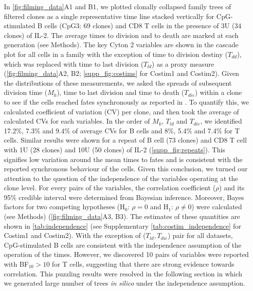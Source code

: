 \documentclass[11pt, a4paper]{article}
\begin{document}
In \cref{fig:filming_data}A1 and B1, we plotted clonally collapsed family trees of filtered clones as a single representative time line stacked vertically for CpG-stimulated B cells (CpG3: 69 clones) and CD8 T cells in the presence of  3U (34 clones) of IL-2. The average times to division and to death are marked at each generation (see Methods). The key Cyton 2 variables are shown in the cascade plot for all cells in a family with the exception of time to division destiny ($T_{dd}$), which was replaced with time to last division ($T_{ld}$) as a proxy measure (\cref{fig:filming_data}A2, B2; \cref{supp_fig:costims} for Costim1 and Costim2). Given the distributions of these measurements, we asked the spreads of subsequent division time ($M_k$), time to last division and time to death ($T_{die}$) within a clone to see if the cells reached fates synchronously as reported in \cite{Mitchell.2018, Marchingo.2016, Hawkins.2009}. To quantify this, we calculated coefficient of variation (CV) per clone, and then took the average of calculated CVs for each variables. In the order of $M_k$, $T_{ld}$ and $T_{die}$, we identified 17.2\%, 7.3\% and 9.4\% of average CVs for B cells and 8\%, 5.4\% and 7.4\% for T cells. Similar results were shown for a repeat of B cell (73 clones) and CD8 T cell with 1U (28 clones) and 10U (50 clones) of IL-2 (\cref{supp_fig:repeats}). This signifies low variation around the mean times to fates and is consistent with the reported synchronous behaviour of the cells. Given this conclusion, we turned our attention to the question of the independence of the variables operating at the clone level. For every pairs of the variables, the correlation coefficient ($\rho$) and its 95\% credible interval were determined from Bayesian inference. Moreover, Bayes factors for two competing hypotheses (H$_0$: $\rho=0$ and H$_1$: $\rho \neq 0$) were calculated (see Methods) (\cref{fig:filming_data}A3, B3). The estimates of these quantities are shown in \cref{tab:independence} (see Supplementary \cref{tab:costim_independence} for Costim1 and Costim2). With the exception of ($T_{ld}, T_{die}$) pair for all datasets, CpG-stimulated B cells are consistent with the independence assumption of the operation of the times. However, we discovered 10 pairs of variables were reported with BF$_{10}>10$ for T cells, suggesting that there are strong evidence towards correlation. This puzzling results were resolved in the following section in which we generated large number of trees \textit{in silico} under the independence assumption.
\end{document}
